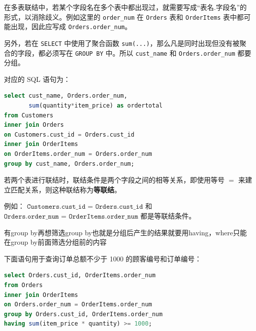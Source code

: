 \begin{example}
\begin{dxtips}
\end{dxtips}
\begin{example}
在多表联结中，若某个字段名在多个表中都出现过，就需要写成“表名.\allowbreak 字段名”的形式，以消除歧义。例如这里的 \verb|order_num| 在 \verb|Orders| 表和 \verb|OrderItems| 表中都可能出现，因此应写成 \verb|Orders.order_num|。

另外，若在 \verb|SELECT| 中使用了聚合函数 \verb|sum(...)|，那么凡是同时出现但没有被聚合的字段，都必须写在 \verb|GROUP BY| 中。所以 \verb|cust_name| 和 \verb|Orders.order_num| 都要分组。

对应的 SQL 语句为：
\begin{lstlisting}[language=SQL]
select cust_name, Orders.order_num,
       sum(quantity*item_price) as ordertotal
from Customers
inner join Orders
on Customers.cust_id = Orders.cust_id
inner join OrderItems
on OrderItems.order_num = Orders.order_num
group by cust_name, Orders.order_num;
\end{lstlisting}
\end{example}
\begin{definition}[等联结]
若两个表进行联结时，联结条件是两个字段之间的相等关系，即使用等号 \(=\) 来建立匹配关系，则这种联结称为\textbf{等联结}。

例如：
$
\texttt{Customers.cust\_id = Orders.cust\_id}
$
和
$
\texttt{Orders.order\_num = OrderItems.order\_num}
$
都是等联结条件。
\end{definition}
\begin{dxtips}
    有group by再想筛选group by也就是分组后产生的结果就要用having，where只能在group by前面筛选分组前的内容
\end{dxtips}
\begin{example}
下面语句用于查询订单总额不少于 1000 的顾客编号和订单编号：
\begin{lstlisting}[language=SQL]
select Orders.cust_id, OrderItems.order_num
from Orders
inner join OrderItems
on Orders.order_num = OrderItems.order_num
group by Orders.cust_id, OrderItems.order_num
having sum(item_price * quantity) >= 1000;
\end{lstlisting}


\end{example}
\end{example}
